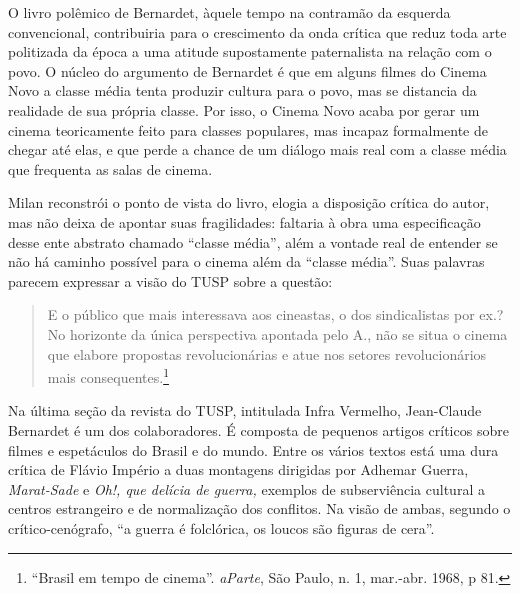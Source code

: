 O livro polêmico de Bernardet, àquele tempo na contramão da esquerda
convencional, contribuiria para o crescimento da onda crítica que reduz
toda arte politizada da época a uma atitude supostamente paternalista na
relação com o povo. O núcleo do argumento de Bernardet é que em alguns
filmes do Cinema Novo a classe média tenta produzir cultura para o povo,
mas se distancia da realidade de sua própria classe. Por isso, o Cinema
Novo acaba por gerar um cinema teoricamente feito para classes
populares, mas incapaz formalmente de chegar até elas, e que perde a
chance de um diálogo mais real com a classe média que frequenta as salas
de cinema.

Milan reconstrói o ponto de vista do livro, elogia a disposição crítica
do autor, mas não deixa de apontar suas fragilidades: faltaria à obra
uma especificação desse ente abstrato chamado “classe média”, além a
vontade real de entender se não há caminho possível para o cinema além
da “classe média”. Suas palavras parecem expressar a visão do TUSP sobre
a questão:

\begin{quote}
E o público que mais interessava aos cineastas, o dos sindicalistas por
ex.? No horizonte da única perspectiva apontada pelo A., não se situa o
cinema que elabore propostas revolucionárias e atue nos setores
revolucionários mais consequentes.\footnote{“Brasil em tempo de cinema”.
  \textit{aParte}, São Paulo, n. 1, mar.-abr. 1968, p 81.}
\end{quote}

Na última seção da revista do TUSP, intitulada Infra Vermelho,
Jean-Claude Bernardet é um dos colaboradores. É composta de pequenos
artigos críticos sobre filmes e espetáculos do Brasil e do mundo. Entre
os vários textos está uma dura crítica de Flávio Império a duas
montagens dirigidas por Adhemar Guerra, \textit{Marat-Sade} e \textit{Oh!, que
delícia de guerra,} exemplos de subserviência cultural a centros
estrangeiro e de normalização dos conflitos. Na visão de ambas, segundo
o crítico-cenógrafo, “a guerra é folclórica, os loucos são figuras de
cera”.


